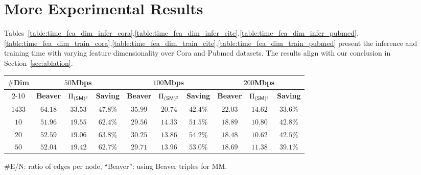 
\section{More Experimental Results}
\label{sec::more_exp}
Tables~\ref{table:time_fea_dim_infer_cora},\ref{table:time_fea_dim_infer_cite},\ref{table:time_fea_dim_infer_pubmed},\ref{table:time_fea_dim_train_cora},\ref{table:time_fea_dim_train_cite},\ref{table:time_fea_dim_train_pubmed} present the inference and training time with varying feature dimensionality over Cora and Pubmed datasets.
The results align with our conclusion in Section~\ref{sec:ablation}.
 

\begin{table*}[!t]
 	\centering
 	\caption{Inference Time (seconds) with Varying Feature Dimensionality over Cora}
 	\label{table:time_fea_dim_infer_cora}
 \setlength\tabcolsep{8pt}
 	 	\begin{tabular}{c|c|c|c|c|c|c|c|c|c}
 	 	\hline
 \multirow{2}{*}{\textbf{$\#$Dim}} &\multicolumn{3}{c|}{\textbf{$50$Mbps}} &\multicolumn{3}{c|}{\textbf{$100$Mbps}}&\multicolumn{3}{c}{\textbf{$200$Mbps}}
 \\\cline{2-10}
 	& \textbf{Beaver} & ${\Pi_{\mathsf{(SM)^2}}}$ & \textbf{Saving} & \textbf{Beaver} & ${\Pi_{\mathsf{(SM)^2}}}$ 	& \textbf{Saving} & \textbf{Beaver} & ${\Pi_{\mathsf{(SM)^2}}}$ & \textbf{Saving} \\
 	 	\hline
 	 $1433$&$64.18$&$33.53$&$47.8\%$&$35.99$&$20.74$&$ 42.4\%$&$22.03$& $14.62$& $33.6\%$\\
 	 $10$&$51.96$&$19.55$&$62.4\%$&$29.56$&$14.33$&$51.5\%$&$18.89$& $10.80$& $42.8\%$\\
 	 $20$&$52.59$&$19.06$&$63.8\%$&$30.25$&$13.86$&$54.2\%$&$18.48$& $10.62$& $42.5\%$\\
 	 $50$&$52.04$&$19.42$&$62.7\%$&$29.71$&$13.96$&$53.0\%$&$18.69$& $11.38$& $39.1\%$\\\hline
 	 \end{tabular}
 	
 	$\#$E/N: ratio of edges per node,
    ``Beaver'': using Beaver triples for MM.
\end{table*}

